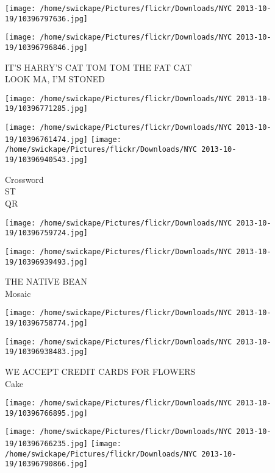 \documentclass[10pt,letterpaper]{article}
\begin{document}
\texttt{[image: /home/swickape/Pictures/flickr/Downloads/NYC 2013-10-19/10396797636.jpg]}

\vspace{0.25in}
\texttt{[image: /home/swickape/Pictures/flickr/Downloads/NYC 2013-10-19/10396796846.jpg]}

IT'S HARRY'S CAT TOM TOM THE FAT CAT\\
LOOK MA, I'M STONED\\
\pagebreak

\texttt{[image: /home/swickape/Pictures/flickr/Downloads/NYC 2013-10-19/10396771285.jpg]}

\vspace{0.25in}
\texttt{[image: /home/swickape/Pictures/flickr/Downloads/NYC 2013-10-19/10396761474.jpg]}
\texttt{[image: /home/swickape/Pictures/flickr/Downloads/NYC 2013-10-19/10396940543.jpg]}

Crossword\\
ST\\
QR\\
\pagebreak

\texttt{[image: /home/swickape/Pictures/flickr/Downloads/NYC 2013-10-19/10396759724.jpg]}

\vspace{0.25in}
\texttt{[image: /home/swickape/Pictures/flickr/Downloads/NYC 2013-10-19/10396939493.jpg]}

THE NATIVE BEAN\\
Mosaic\\
\pagebreak

\texttt{[image: /home/swickape/Pictures/flickr/Downloads/NYC 2013-10-19/10396758774.jpg]}

\vspace{0.25in}
\texttt{[image: /home/swickape/Pictures/flickr/Downloads/NYC 2013-10-19/10396938483.jpg]}

WE ACCEPT CREDIT CARDS FOR FLOWERS\\
Cake\\
\pagebreak

\texttt{[image: /home/swickape/Pictures/flickr/Downloads/NYC 2013-10-19/10396766895.jpg]}

\vspace{0.25in}
\texttt{[image: /home/swickape/Pictures/flickr/Downloads/NYC 2013-10-19/10396766235.jpg]}
\texttt{[image: /home/swickape/Pictures/flickr/Downloads/NYC 2013-10-19/10396790866.jpg]}
\end{document}
